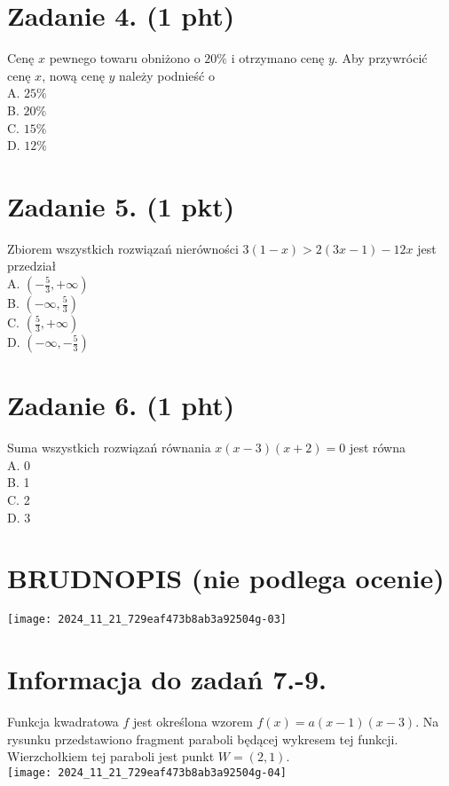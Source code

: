 \documentclass[10pt]{article}
\begin{document}
\section*{Zadanie 4. (1 pht)}
Cenę \(x\) pewnego towaru obniżono o \(20 \%\) i otrzymano cenę \(y\). Aby przywrócić cenę \(x\), nową cenę \(y\) należy podnieść o\\
A. \(25 \%\)\\
B. \(20 \%\)\\
C. \(15 \%\)\\
D. \(12 \%\)

\section*{Zadanie 5. (1 pkt)}
Zbiorem wszystkich rozwiązań nierówności \(3(1-x)>2(3 x-1)-12 x\) jest przedział\\
A. \(\left(-\frac{5}{3},+\infty\right)\)\\
B. \(\left(-\infty, \frac{5}{3}\right)\)\\
C. \(\left(\frac{5}{3},+\infty\right)\)\\
D. \(\left(-\infty,-\frac{5}{3}\right)\)

\section*{Zadanie 6. (1 pht)}
Suma wszystkich rozwiązań równania \(x(x-3)(x+2)=0\) jest równa\\
A. 0\\
B. 1\\
C. 2\\
D. 3

\section*{BRUDNOPIS (nie podlega ocenie)}
\begin{center}
\texttt{[image: 2024\_11\_21\_729eaf473b8ab3a92504g-03]}
\end{center}

\section*{Informacja do zadań 7.-9.}
Funkcja kwadratowa \(f\) jest określona wzorem \(f(x)=a(x-1)(x-3)\). Na rysunku przedstawiono fragment paraboli będącej wykresem tej funkcji. Wierzchołkiem tej paraboli jest punkt \(W=(2,1)\).\\
\texttt{[image: 2024\_11\_21\_729eaf473b8ab3a92504g-04]}
\end{document}

